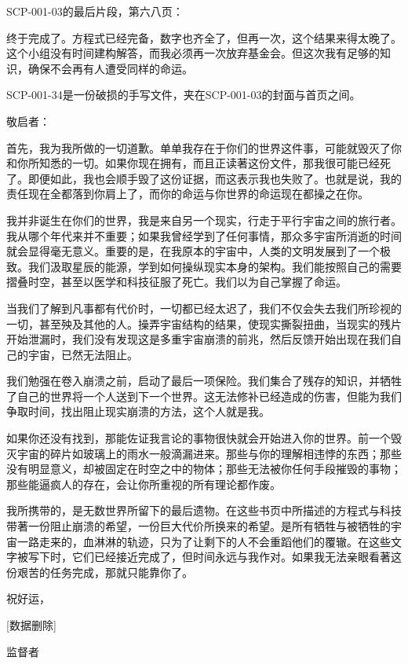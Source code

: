 \documentclass[openany,a4paper]{book} %
\begin{document}
\vspace{8pt}

SCP-001-03的最后片段，第六八页：
\begin{colorboxed}
终于完成了。方程式已经完备，数字也齐全了，但再一次，这个结果来得太晚了。这个小组没有时间建构解答，而我必须再一次放弃基金会。但这次我有足够的知识，确保不会再有人遭受同样的命运。
\end{colorboxed}

\vspace{8pt}

SCP-001-34是一份破损的手写文件，夹在SCP-001-03的封面与首页之间。
\begin{colorboxed}
敬启者：

首先，我为我所做的一切道歉。单单我存在于你们的世界这件事，可能就毁灭了你和你所知悉的一切。如果你现在拥有，而且正读著这份文件，那我很可能已经死了。即便如此，我也会顺手毁了这份证据，而这表示我也失败了。也就是说，我的责任现在全都落到你肩上了，而你的命运与你世界的命运现在都操之在你。\vspace{12pt}

我并非诞生在你们的世界，我是来自另一个现实，行走于平行宇宙之间的旅行者。我从哪个年代来并不重要；如果我曾经学到了任何事情，那众多宇宙所消逝的时间就会显得毫无意义。重要的是，在我原本的宇宙中，人类的文明发展到了一个极致。我们汲取星辰的能源，学到如何操纵现实本身的架构。我们能按照自己的需要摺叠时空，甚至以医学和科技征服了死亡。我们以为自己掌握了命运。\vspace{12pt}

当我们了解到凡事都有代价时，一切都已经太迟了，我们不仅会失去我们所珍视的一切，甚至殃及其他的人。操弄宇宙结构的结果，使现实撕裂扭曲，当现实的残片开始泄漏时，我们没有发现这是多重宇宙崩溃的前兆，然后反馈开始出现在我们自己的宇宙，已然无法阻止。\vspace{12pt}

我们勉强在卷入崩溃之前，启动了最后一项保险。我们集合了残存的知识，并牺牲了自己的世界将一个人送到下一个世界。这无法修补已经造成的伤害，但能为我们争取时间，找出阻止现实崩溃的方法，这个人就是我。\vspace{12pt}

如果你还没有找到，那能佐证我言论的事物很快就会开始进入你的世界。前一个毁灭宇宙的碎片如玻璃上的雨水一般滴漏进来。那些与你的理解相违悖的东西；那些没有明显意义，却被固定在时空之中的物体；那些无法被你任何手段摧毁的事物；那些能逼疯人的存在，会让你所重视的所有理论都作废。\vspace{12pt}

我所携带的，是无数世界所留下的最后遗物。在这些书页中所描述的方程式与科技带著一份阻止崩溃的希望，一份巨大代价所换来的希望。是所有牺牲与被牺牲的宇宙一路走来的，血淋淋的轨迹，只为了让剩下的人不会重蹈他们的覆辙。在这些文字被写下时，它们已经接近完成了，但时间永远与我作对。如果我无法亲眼看著这份艰苦的任务完成，那就只能靠你了。\vspace{12pt}

祝好运，

[数据删除]

监督者
\end{colorboxed}
\end{document}
